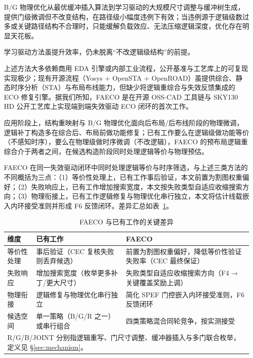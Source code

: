 \documentclass[journal]{IEEEtran}
\begin{document}
B/G 物理优化从最优缓冲插入算法\cite{liang2012buffer}到学习驱动的大规模尺寸调整与缓冲树生成\cite{liu2021rlsizer,huang2025phys,chen2024aito,zhang2025buffalo}，提供门级微调但不改变结构，在路径级小幅度违例下有效；当违例源于逻辑级数过多或关键路径结构不合理时，只能缓解负载效应、无法压缩逻辑深度，优化存在明显天花板\cite{liu2021rlsizer,huang2025phys}。

学习驱动方法\cite{chen2024aito,zhang2025buffalo}虽提升效率，仍未脱离“不改逻辑级结构”的前提。

上述方法大多依赖商用 EDA 引擎或内部工业流程，公开基准与工艺库上的可复现实现极少；现有开源流程（Yosys + OpenSTA + OpenROAD）虽提供综合、静态时序分析（STA）与布局布线能力，但缺少将逻辑重综合与失效反馈集成的 ECO 修复引擎。据我们所知，FAECO 是在开源 OSS-CAD 工具链与 SKY130 HD 公开工艺库上实现端到端失效驱动 ECO 闭环的首次工作。

应用阶段上，结构重映射与 B/G 物理优化面向后布局/后布线阶段的物理微调，逻辑补丁构造多在综合后、布局前做功能修复；已有工作要么在逻辑级做功能等价（不感知时序），要么在物理级做时序微调（不改逻辑），FAECO 的预布局逻辑重综合介于两者之间，在候选构造阶段同时处理逻辑等价与物理预估。

FAECO 在同一失效驱动闭环中同时处理逻辑等价与时序筛选，与上述三类方法的不同概括为三点：（1）等价性处理上，已有工作事后验证，本文前置为割图权重偏好；（2）失败响应上，已有工作增加搜索宽度，本文按失败类型自适应收缩搜索方向；（3）物理衔接上，已有工作逻辑修复与物理优化串行独立，本文将估计线载嵌入内环接受准则并形成 F6 反馈闭环。差异汇总如表~\ref{tab:related_diff}。

\begin{table}[!t]
\centering
\caption{FAECO 与已有工作的关键差异}
\label{tab:related_diff}
\footnotesize
\setlength{\tabcolsep}{3pt}
\begin{tabular}{p{2.2cm}p{2.8cm}p{3.2cm}}
\toprule
\textbf{维度} & \textbf{已有工作} & \textbf{FAECO} \\
\midrule
等价性处理 & 事后验证（CEC 复核失败则丢弃候选） & 前置为割图权重偏好，降低等价性验证失败率（CEC 最终保证） \\
失败响应 & 增加搜索宽度（枚举更多补丁/更大尺寸） & 失败类型自适应收缩搜索方向（F4$\to$关键覆盖奖励上调） \\
物理衔接 & 逻辑修复与物理优化串行独立 & 简化 SPEF 门控嵌入内环接受准则，F6 反馈闭环 \\
候选空间 & 单一策略（B/G/R 之一）或串行组合 & 四类策略混合同轮竞争，按实测接受 \\
\bottomrule
\multicolumn{3}{p{8.0cm}}{\footnotesize R/G/B/JOINT 分别指逻辑重写、门尺寸调整、缓冲器插入与多门联合枚举，定义见 \S\ref{sec:mechanism}。}\\
\end{tabular}
\end{table}
\end{document}
